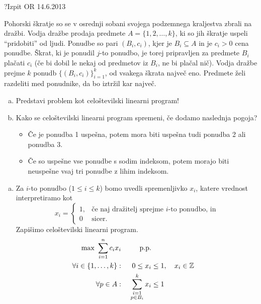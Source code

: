 \begin{naloga}{?}{Izpit OR 14.6.2013}
\begin{vprasanje}
Pohorski škratje so se v osrednji sobani svojega podzemnega kraljestva
zbrali na dražbi.
Vodja dražbe prodaja predmete $A = \{1, 2, \dots, k\}$,
ki so jih škratje uspeli ``pridobiti'' od ljudi.
Ponudbe so pari $(B_i, c_i)$,
kjer je $B_i \subseteq A$ in je $c_i > 0$ cena ponudbe.
Škrat, ki je ponudil $j$-to ponudbo,
je torej pripravljen za predmete $B_i$ plačati $c_i$
(če bi dobil le nekaj od predmetov iz $B_i$, ne bi plačal nič).
Vodja dražbe prejme $k$ ponudb $\{(B_i, c_i)\}_{i=1}^k$,
od vsakega škrata največ eno.
Predmete želi razdeliti med ponudnike, da bo iztržil kar največ.

\begin{enumerate}[(a)]
\item Predstavi problem kot celoštevilski linearni program!

\item Kako se celoštevilski linearni program spremeni,
če dodamo naslednja pogoja?
    \begin{itemize}
    \item Če je ponudba 1 uspešna,
    potem mora biti uspešna tudi ponudba 2 ali ponudba 3.
    \item Če so uspešne vse ponudbe s sodim indeksom,
    potem morajo biti ne\-uspeš\-ne vsaj tri ponudbe z lihim indeksom.
    \end{itemize}
\end{enumerate}
\end{vprasanje}

\begin{odgovor}
\begin{enumerate}[(a)]
\item Za $i$-to ponudbo ($1 \le i \le k$) bomo uvedli spremenljivko $x_i$,
katere vrednost interpretiramo kot
$$
x_i = \begin{cases}
1, & \text{če naj dražitelj sprejme $i$-to ponudbo, in} \\
0  & \text{sicer.}
\end{cases}
$$
Zapišimo celoštevilski linearni program.
\begin{alignat*}{2}
\max \ \sum_{i=1}^n c_i x_i && \text{p.p.} \\
\forall i \in \{1, \dots, k\}: &\ & 0 \le x_i &\le 1, \quad x_i \in \mathbb{Z} \\
\forall p \in A: &\ & \sum_{\substack{i=1 \\ p \in B_i}}^k x_i &\le 1
\end{alignat*}


\end{enumerate}
\end{odgovor}
\end{naloga}
